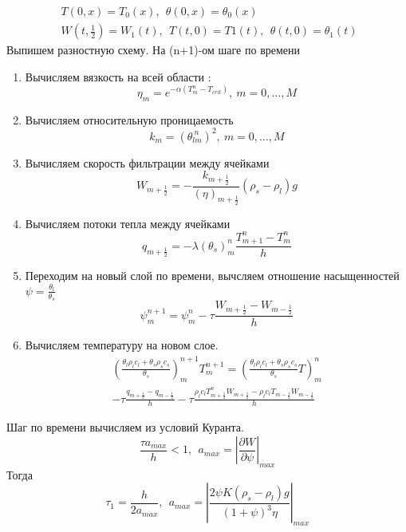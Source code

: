 \documentclass[12pt]{article}
\newcommand{\pd}[2]{\frac{\partial #1}{\partial #2}}
\begin{document}
$$
\begin{aligned}
&T(0,x) = T_0(x), \ \ \theta(0, x) = \theta_0(x) \ \ \\
&W\left(t, \frac12\right)  = W_1(t),\ \ T(t, 0) = T1(t), \ \ \theta(t, 0) = \theta_1(t) \ \ 
\end{aligned}
$$ 
\newpage
Выпишем разностную схему. На (n+1)-ом шаге по времени 
\begin{enumerate}
\item Вычисляем вязкость на всей области : 
$$
\eta_m = e^{-\alpha(T_m^n - T_{crit})},\ m = 0, \dots ,M
$$
\item Вычисляем относительную проницаемость
$$
k_m = (\theta_{lm}^{\ n})^2 , \ m = 0,  \dots ,M
$$
\item Вычисляем скорость фильтрации между ячейками 
$$
W_{m+\frac12} = -\frac{k_{m+\frac12}}{(\eta)_{m+\frac12}}(\rho_s - \rho_l)g
$$
\item Вычисляем потоки тепла между ячейками
$$
q_{m+\frac12} = - \lambda (\theta_{s})_m^{n} \frac{T_{m+1}^n - T_m^n}{h} 
$$
\item Переходим на новый слой по времени, вычсляем отношение насыщенностей $\psi = \frac {\theta_l}{\theta_s}$
$$
\psi_m^{n+1} = \psi_m^n - \tau \frac{W_{m+\frac12} - W_{m-\frac12}}{h}
$$
\item Вычисляем температуру на новом слое. 
\begin{multline}
\left(\frac{\theta_l \rho_l c_l + \theta_s \rho_s c_s}{\theta_s}\right)_m^{n+1} T_m^{n+1} =  \left(\frac{\theta_l \rho_l c_l + \theta_s \rho_s c_s}{\theta_s} T\right)_m^n \\
- \tau\frac{q_{m+\frac12} - q_{m-\frac12}}{h} - \tau\frac{\rho_l c_l T_{m+\frac12}^n W_{m+\frac12} - \rho_l c_l T_{m-\frac12} W_{m-\frac12}}{h}
\end{multline}
\end{enumerate}

Шаг по времени вычисляем из условий Куранта. 
$$
\frac{\tau a_{max}}{h} < 1,\ \ a_{max} = \left|\pd{W}{\psi}\right|_{max}
$$
Тогда
$$
\tau_1 = \frac{h}{2 a_{max}},\ \  a_{max} = \left|\frac{2 \psi K(\rho_s - \rho_l)g}{(1+\psi)^3 \eta}\right|_{max}
$$
\end{document}
